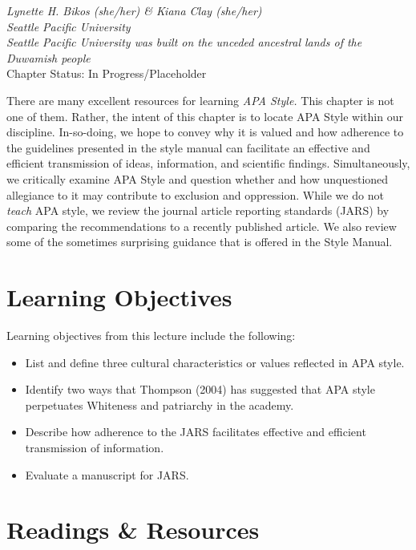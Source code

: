 \documentclass[
  11pt,
]{book}
\providecommand{\tightlist}{%
  \setlength{\itemsep}{0pt}\setlength{\parskip}{0pt}}
\begin{document}
\emph{Lynette H. Bikos (she/her) \& Kiana Clay (she/her)}\\
\emph{Seattle Pacific University}\\
\emph{Seattle Pacific University was built on the unceded ancestral lands of the Duwamish people}\\
Chapter Status: In Progress/Placeholder

There are many excellent resources for learning \emph{APA Style.} This chapter is not one of them. Rather, the intent of this chapter is to locate APA Style within our discipline. In-so-doing, we hope to convey why it is valued and how adherence to the guidelines presented in the style manual can facilitate an effective and efficient transmission of ideas, information, and scientific findings. Simultaneously, we critically examine APA Style and question whether and how unquestioned allegiance to it may contribute to exclusion and oppression. While we do not \emph{teach} APA style, we review the journal article reporting standards (JARS) by comparing the recommendations to a recently published article. We also review some of the sometimes surprising guidance that is offered in the Style Manual.

\hypertarget{learning-objectives-3}{%
\section{Learning Objectives}\label{learning-objectives-3}}

Learning objectives from this lecture include the following:

\begin{itemize}
\tightlist
\item
  List and define three cultural characteristics or values reflected in APA style.
\item
  Identify two ways that Thompson (2004) has suggested that APA style perpetuates Whiteness and patriarchy in the academy.
\item
  Describe how adherence to the JARS facilitates effective and efficient transmission of information.
\item
  Evaluate a manuscript for JARS.
\end{itemize}

\hypertarget{readings-resources}{%
\section{Readings \& Resources}\label{readings-resources}}
\end{document}
